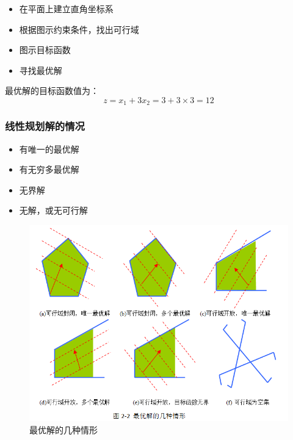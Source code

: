 \begin{frame}{\subsubsecname}
\begin{itemize}
    \item 在平面上建立直角坐标系
    \item 根据图示约束条件，找出可行域
     \item 图示目标函数
     \item 寻找最优解
\end{itemize}
    最优解的目标函数值为：
    $$
    z=x_1+3x_2=3+3\times 3 = 12
    $$
\end{frame}

\begin{frame}{\subsubsecname}
\centering

\end{frame}

\subsubsection{线性规划解的情况}
\begin{frame}{\subsubsecname}
  \begin{itemize}
    \item 有唯一的最优解
    \item  有无穷多最优解
    \item 无界解
    \item  无解，或无可行解
\end{itemize}  
\begin{figure}\label{fig:ch2-2}
  \centering
  \includegraphics[width=4 in,height=2.5 in]{pic/2_2.png}
  \caption{最优解的几种情形}
\end{figure}
\end{frame}


